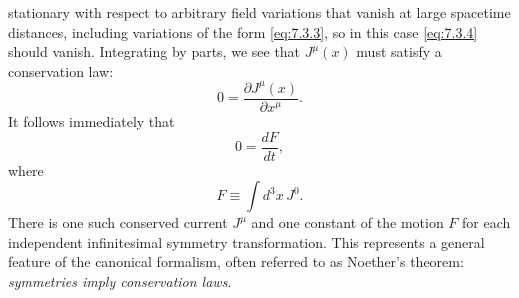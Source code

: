 stationary with respect to arbitrary field variations that vanish at large
spacetime distances, including variations of the form \eqref{eq:7.3.3}, so in this case
\eqref{eq:7.3.4} should vanish. Integrating by parts, we see that $J^\mu(x)$ must satisfy
a conservation law:
\begin{equation}
0=\frac{\partial J^\mu(x)}{\partial x^\mu}.
\tag{7.3.5}\label{eq:7.3.5}
\end{equation}
It follows immediately that
\begin{equation}
0=\frac{dF}{dt},
\tag{7.3.6}\label{eq:7.3.6}
\end{equation}
where
\begin{equation}
F\equiv\int d^3x\,J^0.
\tag{7.3.7}\label{eq:7.3.7}
\end{equation}
There is one such conserved current $J^\mu$ and one constant of the motion $F$
for each independent infinitesimal symmetry transformation. This represents a
general feature of the canonical formalism, often referred to as Noether's
theorem: \emph{symmetries imply conservation laws}.

